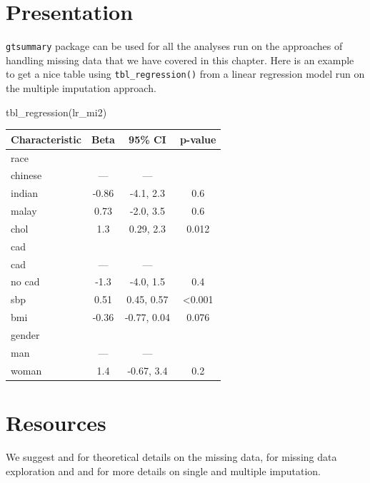 \documentclass[
  10pt,
]{krantz}
\newenvironment{Shaded}{\begin{snugshade}}{\end{snugshade}}
\newcommand{\FunctionTok}[1]{\textcolor[rgb]{0.00,0.00,0.00}{#1}}
\newcommand{\NormalTok}[1]{#1}
\begin{document}
\hypertarget{presentation-1}{%
\section{Presentation}\label{presentation-1}}

\texttt{gtsummary} package can be used for all the analyses run on the approaches of handling missing data that we have covered in this chapter. Here is an example to get a nice table using \texttt{tbl\_regression()} from a linear regression model run on the multiple imputation approach.

\begin{Shaded}
\begin{Highlighting}[]
\FunctionTok{tbl\_regression}\NormalTok{(lr\_mi2)}
\end{Highlighting}
\end{Shaded}

\captionsetup[table]{labelformat=empty,skip=1pt}
\begin{longtable}{lccc}
\toprule
\textbf{Characteristic} & \textbf{Beta} & \textbf{95\% CI} & \textbf{p-value} \\ 
\midrule
race &  &  &  \\ 
chinese & — & — &  \\ 
indian & -0.86 & -4.1, 2.3 & 0.6 \\ 
malay & 0.73 & -2.0, 3.5 & 0.6 \\ 
chol & 1.3 & 0.29, 2.3 & 0.012 \\ 
cad &  &  &  \\ 
cad & — & — &  \\ 
no cad & -1.3 & -4.0, 1.5 & 0.4 \\ 
sbp & 0.51 & 0.45, 0.57 & <0.001 \\ 
bmi & -0.36 & -0.77, 0.04 & 0.076 \\ 
gender &  &  &  \\ 
man & — & — &  \\ 
woman & 1.4 & -0.67, 3.4 & 0.2 \\ 
\bottomrule
\end{longtable}

\hypertarget{resources-3}{%
\section{Resources}\label{resources-3}}

We suggest \citet{Schafer2002} and \citet{kang2013} for theoretical details on the missing data, \citet{Zhang2015} for missing data exploration and \citet{heyman2019} and \citet{buuren2018} for more details on single and multiple imputation.

\backmatter

  

\backmatter
\printindex
\end{document}

